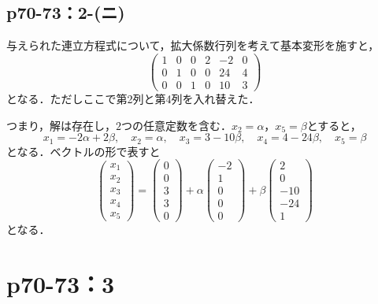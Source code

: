 \documentclass[a4paper,10pt,fleqn]{ltjsarticle}
\begin{document}
\subsection*{p70-73：2-(ニ)}

\begin{tleftbar}
    与えられた連立方程式について，拡大係数行列を考えて基本変形を施すと，
    \[
        \begin{pmatrix} 1 & 0 & 0  & 2 & -2 & 0  \\ 0 & 1& 0  & 0 & 24 & 4 \\ 0 & 0 & 1 & 0 & 10 & 3 \end{pmatrix}
    \]
    となる．ただしここで第2列と第4列を入れ替えた．

    つまり，解は存在し，$2$つの任意定数を含む．$x_2 = \alpha$，$x_5 = \beta$とすると，
    \[
        x_1 = -2\alpha + 2\beta  , \quad x_2 =\alpha  , \quad x_3 = 3 -10\beta  , \quad x_4 = 4 -24 \beta ,\quad x_5 =\beta
    \]
    となる．ベクトルの形で表すと
    \[
        \begin{pmatrix} x_1 \\ x_2 \\ x_3 \\ x_4 \\ x_5 \end{pmatrix}= \begin{pmatrix} 0 \\ 0 \\ 3 \\ 3 \\ 0 \end{pmatrix} +\alpha \begin{pmatrix} -2 \\ 1\\ 0 \\ 0 \\ 0 \end{pmatrix} + \beta \begin{pmatrix} 2 \\ 0 \\ -10 \\ -24 \\ 1 \end{pmatrix}
    \]
    となる．
\end{tleftbar}


\newpage

\section*{p70-73：3}
\end{document}
